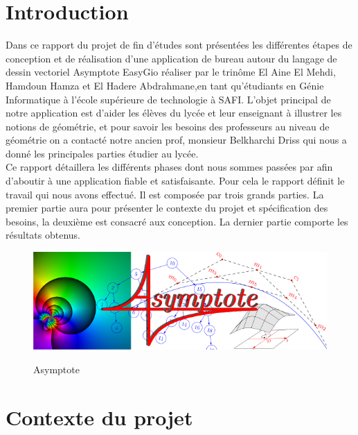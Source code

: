\documentclass[a4paper]{report}
\begin{document}
\chapter*{Introduction}
Dans ce rapport du projet de fin d'études sont présentées les différentes étapes de conception et de réalisation d’une application de bureau autour du langage de dessin vectoriel Asymptote EasyGio réaliser par le trinôme El Aine El Mehdi, Hamdoun Hamza et El Hadere Abdrahmane,en tant qu’étudiants en Génie Informatique à l’école supérieure de technologie à SAFI. L'objet principal de notre application est d'aider les élèves du lycée et leur enseignant à illustrer les notions de géométrie, et pour savoir les besoins des professeurs au niveau de géométrie on a contacté notre ancien prof, monsieur Belkharchi Driss qui nous a donné les principales parties étudier au lycée.\\
Ce rapport détaillera les différents phases dont nous sommes passées par afin d'aboutir à une application fiable et satisfaisante. Pour cela le rapport définit le travail qui nous avons effectué. Il est composée par trois grands parties. La premier partie aura pour présenter le contexte du projet et spécification des besoins, la deuxième est consacré aux conception. La dernier partie comporte les résultats obtenus.\\[0.4cm]
    \begin{figure}[!h] 
        \centering       
        \includegraphics[width=15cm]{images/asymptote.png}\\ \caption{Asymptote} \label{Asymptote} 
    \end{figure}
\chapter{Contexte du projet}
\end{document}
